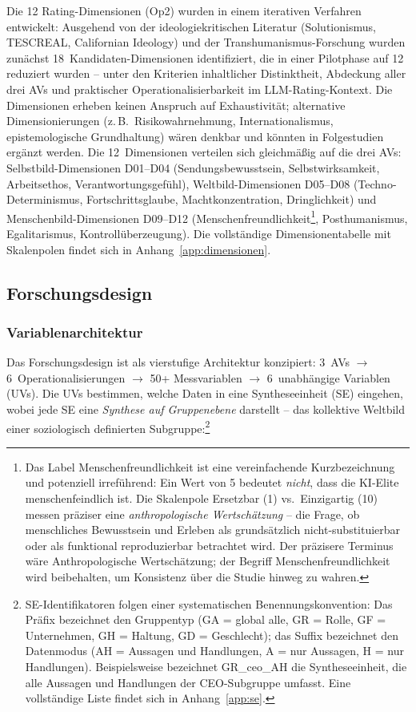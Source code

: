 \documentclass[12pt,a4paper]{article}
\begin{document}
Die 12 Rating-Dimensionen (Op2) wurden in einem iterativen Verfahren entwickelt: Ausgehend von der ideologiekritischen Literatur (Solutionismus, TESCREAL, Californian Ideology) und der Trans\-huma\-nis\-mus-For\-schung wurden zunächst 18~Kandi\-daten-Dimen\-sionen identifiziert, die in einer Pilotphase auf 12 reduziert wurden -- unter den Kriterien inhaltlicher Distinktheit, Abdeckung aller drei AVs und praktischer Ope\-ra\-tio\-na\-li\-sier\-bar\-keit im LLM-Rating-Kontext. Die Dimensionen erheben keinen Anspruch auf Exhaustivität; alternative Dimen\-sio\-nie\-run\-gen (z.\,B.\ Risikowahrnehmung, Inter\-na\-tio\-na\-lis\-mus, episte\-mo\-lo\-gi\-sche Grundhaltung) wären denkbar und könnten in Folgestudien ergänzt werden. Die 12~Dimensionen verteilen sich gleichmäßig auf die drei AVs: Selbstbild-Dimensionen D01--D04 (Sendungsbewusstsein, Selbstwirksamkeit, Arbeitsethos, Verant\-wor\-tungs\-ge\-fühl), Weltbild-Dimensionen D05--D08 (Techno-Determinismus, Fort\-schritts\-glaube, Macht\-kon\-zen\-tra\-tion, Dringlichkeit) und Menschenbild-Dimensionen D09--D12 (Menschenfreundlichkeit\footnote{Das Label \glqq Menschenfreundlichkeit\grqq{} ist eine vereinfachende Kurzbezeichnung und potenziell irreführend: Ein Wert von 5 bedeutet \emph{nicht}, dass die KI-Elite \glqq menschenfeindlich\grqq{} ist. Die Skalenpole \glqq Ersetzbar\grqq{} (1) vs.\ \glqq Einzigartig\grqq{} (10) messen präziser eine \emph{anthropologische Wertschätzung} -- die Frage, ob menschliches Bewusstsein und Erleben als grundsätzlich nicht-substituierbar oder als funktional reproduzierbar betrachtet wird. Der präzisere Terminus wäre \glqq Anthropologische Wertschätzung\grqq; der Begriff \glqq Menschenfreundlichkeit\grqq{} wird beibehalten, um Konsistenz über die Studie hinweg zu wahren.}, Posthumanismus, Egalitarismus, Kontrollüberzeugung). Die vollständige Dimensionentabelle mit Skalenpolen findet sich in Anhang~\ref{app:dimensionen}.


\subsection{Forschungsdesign}
\label{sec:methodik:design}

\subsubsection{Variablenarchitektur}

Das Forschungsdesign ist als vierstufige Architektur konzipiert: 3~AVs $\to$ 6~Operationalisierungen $\to$ 50+ Messvariablen $\to$ 6~unabhängige Variablen (UVs). Die UVs bestimmen, welche Daten in eine Syntheseeinheit (SE) eingehen, wobei jede SE eine \emph{Synthese auf Gruppenebene} darstellt -- das kollektive Weltbild einer soziologisch definierten Subgruppe:\footnote{SE-Identifikatoren folgen einer systematischen Benennungskonvention: Das Präfix bezeichnet den Gruppentyp (GA = global alle, GR = Rolle, GF = Unternehmen, GH = Haltung, GD = Geschlecht); das Suffix bezeichnet den Datenmodus (AH = Aussagen und Handlungen, A = nur Aussagen, H = nur Handlungen). Beispielsweise bezeichnet GR\_ceo\_AH die Syntheseeinheit, die alle Aussagen und Handlungen der CEO-Subgruppe umfasst. Eine vollständige Liste findet sich in Anhang~\ref{app:se}.}
\end{document}
